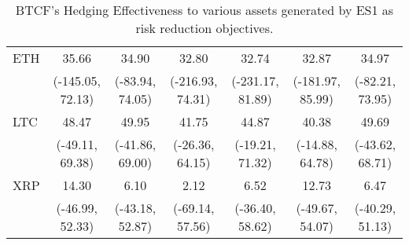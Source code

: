 \begin{table}[H]
{\begin{tabular}{lcccccc}
ETH     &             35.66 &            34.90 &             32.80 &             32.74 &             32.87 &            34.97 \\
        &  (-145.05, 72.13) &  (-83.94, 74.05) &  (-216.93, 74.31) &  (-231.17, 81.89) &  (-181.97, 85.99) &  (-82.21, 73.95) \\
LTC     &             48.47 &            49.95 &             41.75 &             44.87 &             40.38 &            49.69 \\
        &   (-49.11, 69.38) &  (-41.86, 69.00) &   (-26.36, 64.15) &   (-19.21, 71.32) &   (-14.88, 64.78) &  (-43.62, 68.71) \\
XRP     &             14.30 &             6.10 &              2.12 &              6.52 &             12.73 &             6.47 \\
        &   (-46.99, 52.33) &  (-43.18, 52.87) &   (-69.14, 57.56) &   (-36.40, 58.62) &   (-49.67, 54.07) &  (-40.29, 51.13) \\
\bottomrule
\end{tabular}}
\caption{BTCF's Hedging Effectiveness to various assets generated by ES1 as risk reduction objectives.}
\label{tab:ES1HE}
\end{table}